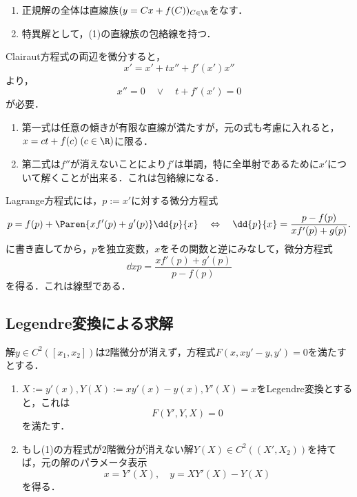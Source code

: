 \documentclass[uplatex,dvipdfmx]{jsreport}
\begin{document}
\begin{proposition}\mbox{}
    \begin{enumerate}
        \item 正規解の全体は直線族$(y=Cx+f(C))_{C\in\R}$をなす．
        \item 特異解として，(1)の直線族の包絡線を持つ．
    \end{enumerate}
\end{proposition}
\begin{Proof}
    Clairaut方程式の両辺を微分すると，
    \[x'=x'+tx''+f'(x')x''\]
    より，
    \[x''=0\quad\lor\quad t+f'(x')=0\]
    が必要．
    \begin{enumerate}
        \item 第一式は任意の傾きが有限な直線が満たすが，元の式も考慮に入れると，$x=ct+f(c)\;(c\in\R)$に限る．
        \item 第二式は$f''$が消えないことにより$f'$は単調，特に全単射であるために$x'$について解くことが出来る．これは包絡線になる．
    \end{enumerate}
\end{Proof}

\begin{remarks}
    Lagrange方程式には，$p:=x'$に対する微分方程式
    \[p=f(p)+\Paren{xf'(p)+g'(p)}\dd{p}{x}\quad\Leftrightarrow\quad\dd{p}{x}=\frac{p-f(p)}{xf'(p)+g(p)}.\]
    に書き直してから，$p$を独立変数，$x$をその関数と逆にみなして，微分方程式
    \[\dd{x}{p}=\frac{xf'(p)+g'(p)}{p-f(p)}\]
    を得る．これは線型である\cite{高崎金久-ODE}．
\end{remarks}

\subsection{Legendre変換による求解}

\begin{theorem}
    解$y\in C^2([x_1,x_2])$は2階微分が消えず，方程式$F(x,xy'-y,y')=0$を満たすとする．
    \begin{enumerate}
        \item $X:=y'(x),Y(X):=xy'(x)-y(x),Y'(X)=x$をLegendre変換とすると，これは
        \[F(Y',Y,X)=0\]
        を満たす．
        \item もし(1)の方程式が2階微分が消えない解$Y(X)\in C^2((X',X_2))$を持てば，元の解のパラメータ表示
        \[x=Y'(X),\quad y=XY'(X)-Y(X)\]
        を得る．
    \end{enumerate}
\end{theorem}
\end{document}
